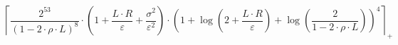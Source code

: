 \[\left\lceil \frac{2^{53}}{\left(1 - 2 \cdot \rho \cdot L\right)^{8}} \cdot \left(1 + \frac{L \cdot R}{\varepsilon} + \frac{\sigma^{2}}{\varepsilon^{2}}\right) \cdot \left(1 + \log\left(2 + \frac{L \cdot R}{\varepsilon}\right) + \log\left(\frac{2}{1 - 2 \cdot \rho \cdot L}\right)\right)^{4} \right\rceil_{+}\]

